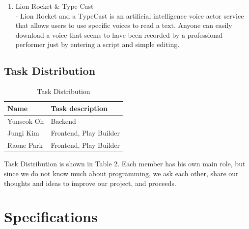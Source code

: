 \documentclass[conference]{IEEEtran}
\begin{document}
\begin{enumerate}
    \item Lion Rocket \& Type Cast \\
    - Lion Rocket and a TypeCast is an artificial intelligence voice actor service that allows users to use specific voices to read a text. Anyone can easily download a voice that seems to have been recorded by a professional performer just by entering a script and simple editing.
\end{enumerate}

\subsection{Task Distribution}

\begin{table}[htbp]
\begin{center}
\caption{Task Distribution}
\begin{tabular}{|l|l|}
\hline
Name        & Task description          \\ \hline
Yunseok Oh  & Backend                   \\ \hline
Jungi Kim   & Frontend, Play Builder    \\ \hline
Raone Park  & Frontend, Play Builder    \\ \hline
\end{tabular}
\end{center}
\end{table}
Task Distribution is shown in Table 2. Each member has his own main role, but since we do not know much about programming, we ask each other, share our thoughts and ideas to improve our project, and proceeds.

\section{Specifications}
\end{document}
